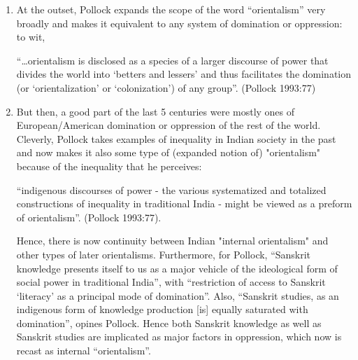 {\renewcommand\theenumi{\Alph{enumi}}
\renewcommand\labelenumi{{\bf\theenumi.}}
\begin{enumerate}
\item At the outset, Pollock expands the scope of the word “orientalism” very broadly and makes it equivalent to any system of domination or oppression: to wit, 
\begin{myquote}
“…orientalism is disclosed as a species of a larger discourse of power that divides the world into ‘betters and lessers’ and thus facilitates the domination (or ‘orientalization’ or ‘colonization’) of any group”. \hfill(Pollock 1993:77)
\end{myquote}

\item But then, a good part of the last 5 centuries were mostly ones of European/American domination or oppression of the rest of the world. Cleverly, Pollock takes examples of inequality in Indian society in the past and now makes it also some type of (expanded notion of) "orientalism" because of the inequality that he perceives:
\begin{myquote}
“indigenous discourses of power - the various systematized and totalized constructions of inequality in traditional India - might be viewed as a preform of orientalism”. \hfill(Pollock 1993:77).
\end{myquote}

Hence, there is now continuity between Indian "internal orientalism" and other types of later orientalisms. Furthermore, for Pollock, “Sanskrit knowledge presents itself to us as a major vehicle of the ideological form of social power in traditional India”, with “restriction of access to Sanskrit ‘literacy’ as a principal mode of domination”. Also, “Sanskrit studies, as an indigenous form of knowledge production [is] equally saturated with domination”, opines Pollock. Hence both Sanskrit knowledge as well as Sanskrit studies are implicated as major factors in oppression, which now is recast as internal “orientalism”.


\end{enumerate}}
